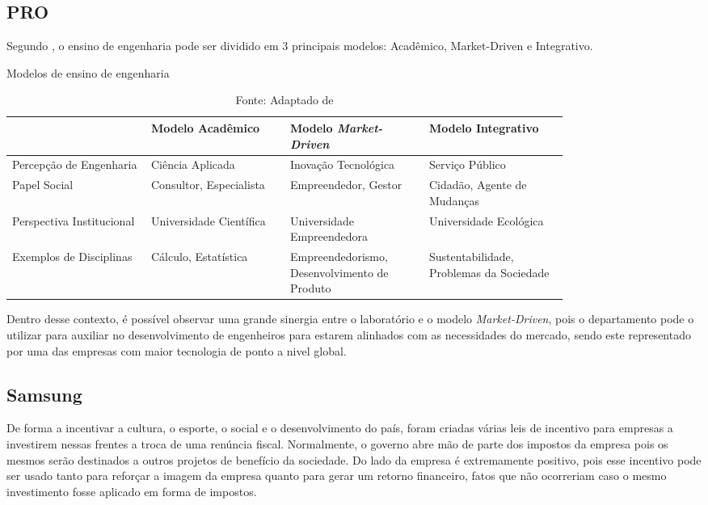 \subsection{PRO}
\label{sec:con_pro}

Segundo , o ensino de engenharia pode ser dividido em 3 principais modelos: Acadêmico, Market-Driven e Integrativo.

\begin{table}[h]
\begin{center}
\caption{Modelos de ensino de engenharia}
\label{tab:modelos_ensino_tab}
{\def\arraystretch{2}\tabcolsep=10pt
\begin{tabular}{>{\raggedright}p{0.2\linewidth}>{\raggedright\arraybackslash}p{0.2\linewidth}>{\raggedright\arraybackslash}p{0.2\linewidth}>{\raggedright\arraybackslash}p{0.2\linewidth}}
\hline
     & Modelo Acadêmico & Modelo \textit{Market-Driven} & Modelo Integrativo \\ \hline
     Percepção de Engenharia & Ciência Aplicada & Inovação Tecnológica & Serviço Público \\
     Papel Social & Consultor, Especialista & Empreendedor, Gestor & Cidadão, Agente de Mudanças \\
     Perspectiva Institucional & Universidade Científica & Universidade Empreendedora & Universidade Ecológica  \\
	 Exemplos de Disciplinas & Cálculo, Estatística & Empreendedorismo, Desenvolvimento de Produto & Sustentabilidade, Problemas da Sociedade \\ \hline
\end{tabular}%
}
\caption* {Fonte: Adaptado de }
\end{center}
\end{table}

Dentro desse contexto, é possível observar uma grande sinergia entre o laboratório e o modelo \textit{Market-Driven}, pois o departamento pode o utilizar para auxiliar no desenvolvimento de engenheiros para estarem alinhados com as necessidades do mercado, sendo este representado por uma das empresas com maior tecnologia de ponto a nivel global.

\subsection{Samsung}
\label{sec:con_samsung}

De forma a incentivar a cultura, o esporte, o social e o desenvolvimento do país, foram criadas várias leis de incentivo para empresas a investirem nessas frentes a troca de uma renúncia fiscal.  Normalmente, o governo abre mão de parte dos impostos da empresa pois os mesmos serão destinados a outros projetos de benefício da sociedade. Do lado da empresa é extremamente positivo, pois esse incentivo pode ser usado tanto para reforçar a imagem da empresa quanto para gerar um retorno financeiro, fatos que não ocorreriam caso o mesmo investimento fosse aplicado em forma de impostos.

